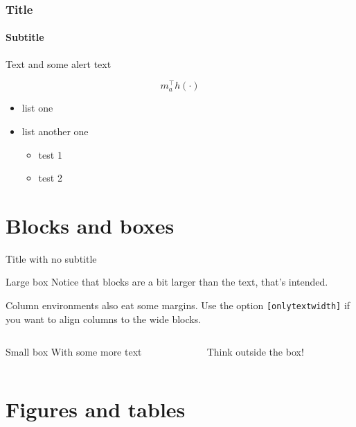 \documentclass[11pt,aspectratio=169]{beamer}
\begin{document}
\begin{frame}

	\frametitle{Title}
	\framesubtitle{Subtitle}
	
	Text and some \alert{alert text}
	
	\[
	m_a^\top h(\cdot)
	\]
	
	
	\begin{itemize}
	\item list one
	\item list another one
		\begin{itemize}
		\item test 1
		\item test 2
		\end{itemize}
	\end{itemize}

\end{frame}

\section{Blocks and boxes}

\begin{frame}{Title with no subtitle}

	\begin{block}{Large box}
	Notice that blocks are a bit larger than the text, that's intended.
	\end{block}
	
	Column environments also eat some margins. Use the option \texttt{[onlytextwidth]} if you want to align columns to the wide blocks.
	
	\begin{columns}[onlytextwidth]
	\begin{column}{0.45\textwidth}
		\begin{block}{Small box}
		With some more text
		\end{block}
	\end{column}
	\begin{column}{0.5\textwidth}
		Think outside the box!
	\end{column}
	\end{columns}

\end{frame}

\section{Figures and tables}
\end{document}
